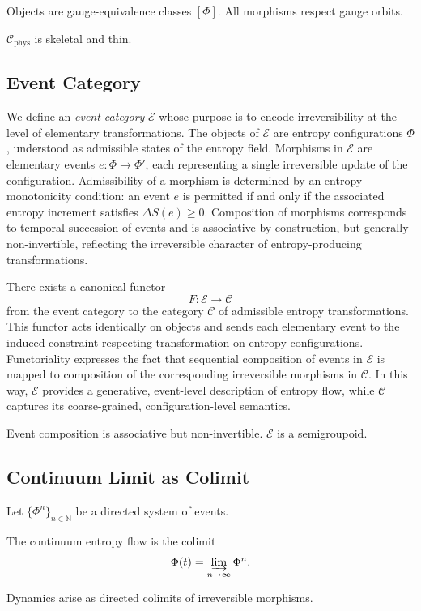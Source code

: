 \documentclass[11pt]{article}
\begin{document}
Objects are gauge-equivalence classes $[\Phi]$.
All morphisms respect gauge orbits.

$\mathcal{C}_{\text{phys}}$ is skeletal and thin.

\subsection*{Event Category}

We define an \emph{event category} $\mathcal{E}$ whose purpose is to encode irreversibility at the level of elementary transformations. The objects of $\mathcal{E}$ are entropy configurations $\Phi$, understood as admissible states of the entropy field. Morphisms in $\mathcal{E}$ are elementary events $e : \Phi \to \Phi'$, each representing a single irreversible update of the configuration. Admissibility of a morphism is determined by an entropy monotonicity condition: an event $e$ is permitted if and only if the associated entropy increment satisfies $\Delta S(e) \ge 0$. Composition of morphisms corresponds to temporal succession of events and is associative by construction, but generally non-invertible, reflecting the irreversible character of entropy-producing transformations.

There exists a canonical functor
\[
F : \mathcal{E} \to \mathcal{C}
\]
from the event category to the category $\mathcal{C}$ of admissible entropy transformations. This functor acts identically on objects and sends each elementary event to the induced constraint-respecting transformation on entropy configurations. Functoriality expresses the fact that sequential composition of events in $\mathcal{E}$ is mapped to composition of the corresponding irreversible morphisms in $\mathcal{C}$. In this way, $\mathcal{E}$ provides a generative, event-level description of entropy flow, while $\mathcal{C}$ captures its coarse-grained, configuration-level semantics.


Event composition is associative but non-invertible.
$\mathcal{E}$ is a semigroupoid.

\subsection*{Continuum Limit as Colimit}

Let $\{ \Phi^n \}_{n\in\mathbb{N}}$ be a directed system of events.

The continuum entropy flow is the colimit
\[
\Phi(t) = \varinjlim_{n\to\infty} \Phi^n.
\]

Dynamics arise as directed colimits of irreversible morphisms.
\end{document}
